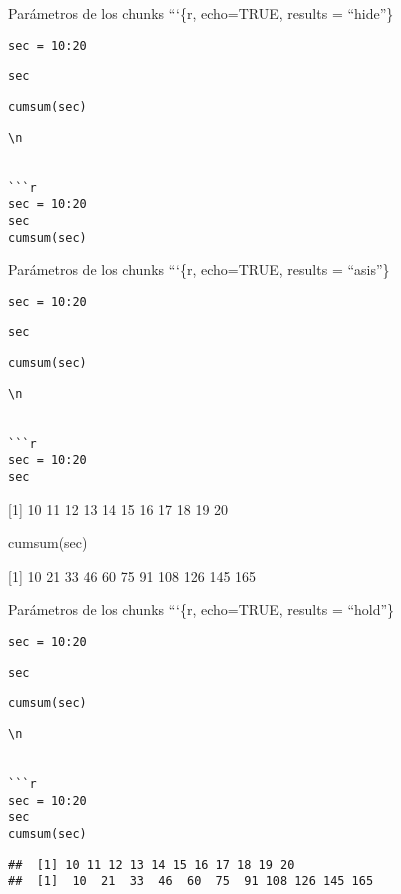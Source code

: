 \documentclass[
  ignorenonframetext,
]{beamer}
\newenvironment{Shaded}{\begin{snugshade}}{\end{snugshade}}
\newcommand{\FunctionTok}[1]{\textcolor[rgb]{0.00,0.00,0.00}{#1}}
\newcommand{\NormalTok}[1]{#1}
\begin{document}
\begin{frame}[fragile]{Parámetros de los chunks}
\protect\hypertarget{paruxe1metros-de-los-chunks-3}{}
```\{r, echo=TRUE, results = ``hide''\}

\texttt{sec\ =\ 10:20}

\texttt{sec}

\texttt{cumsum(sec)}

\begin{verbatim}
\n


```r
sec = 10:20
sec
cumsum(sec)
\end{verbatim}
\end{frame}

\begin{frame}[fragile]{Parámetros de los chunks}
\protect\hypertarget{paruxe1metros-de-los-chunks-4}{}
```\{r, echo=TRUE, results = ``asis''\}

\texttt{sec\ =\ 10:20}

\texttt{sec}

\texttt{cumsum(sec)}

\begin{verbatim}
\n


```r
sec = 10:20
sec
\end{verbatim}

{[}1{]} 10 11 12 13 14 15 16 17 18 19 20

\begin{Shaded}
\begin{Highlighting}[]
\FunctionTok{cumsum}\NormalTok{(sec)}
\end{Highlighting}
\end{Shaded}

{[}1{]} 10 21 33 46 60 75 91 108 126 145 165
\end{frame}

\begin{frame}[fragile]{Parámetros de los chunks}
\protect\hypertarget{paruxe1metros-de-los-chunks-5}{}
```\{r, echo=TRUE, results = ``hold''\}

\texttt{sec\ =\ 10:20}

\texttt{sec}

\texttt{cumsum(sec)}

\begin{verbatim}
\n


```r
sec = 10:20
sec
cumsum(sec)
\end{verbatim}

\begin{verbatim}
##  [1] 10 11 12 13 14 15 16 17 18 19 20
##  [1]  10  21  33  46  60  75  91 108 126 145 165
\end{verbatim}
\end{frame}
\end{document}
